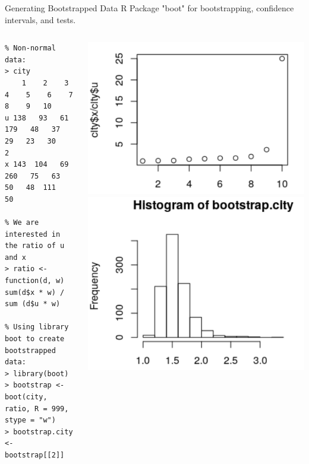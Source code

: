 \begin{frame}[fragile]{Generating Bootstrapped Data}
  {R Package "boot" for bootstrapping, confidence intervals, and tests.}
  \begin{columns}[T]
    {\smaller
\begin{verbatim}
% Non-normal data:
> city
    1    2    3    4    5    6    7    8    9   10
u 138   93   61  179   48   37   29   23   30    2
x 143  104   69  260   75   63   50   48  111   50

% We are interested in the ratio of u and x
> ratio <- function(d, w) sum(d$x * w) / sum (d$u * w)

% Using library boot to create bootstrapped data:
> library(boot)
> bootstrap <- boot(city, ratio, R = 999, stype = "w")
> bootstrap.city <- bootstrap[[2]]
\end{verbatim}
    }
    \includegraphics[width=.9\textwidth]{../img/bootstrap_original}
    \includegraphics[width=.9\textwidth]{../img/bootstrap_histogram}
  \end{columns}
\end{frame}

